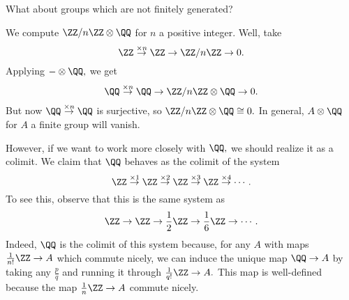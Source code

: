 \documentclass[../notes.tex]{subfiles}
\begin{document}
What about groups which are not finitely generated?
\begin{example}
	We compute $\ZZ/n\ZZ\otimes\QQ$ for $n$ a positive integer. Well, take
	\[\ZZ\stackrel{\times n}\to\ZZ\to\ZZ/n\ZZ\to0.\]
	Applying $-\otimes\QQ,$ we get
	\[\QQ\stackrel{\times n}\to\QQ\to\ZZ/n\ZZ\otimes\QQ\to0.\]
	But now $\QQ\stackrel{\times n}\to\QQ$ is surjective, so $\ZZ/n\ZZ\otimes\QQ\cong0.$ In general, $A\otimes\QQ$ for $A$ a finite group will vanish.
\end{example}
However, if we want to work more closely with $\QQ,$ we should realize it as a colimit. We claim that $\QQ$ behaves as the colimit of the system
\[\ZZ\stackrel{\times1}\to\ZZ\stackrel{\times2}\to\ZZ\stackrel{\times3}\to\ZZ\stackrel{\times4}\to\cdots.\]
To see this, observe that this is the same system as
\[\ZZ\to\ZZ\to\frac12\ZZ\to\frac16\ZZ\to\cdots.\]
Indeed, $\QQ$ is the colimit of this system because, for any $A$ with maps $\frac1{n!}\ZZ\to A$ which commute nicely, we can induce the unique map $\QQ\to A$ by taking any $\frac pq$ and running it through $\frac1{q!}\ZZ\to A.$ This map is well-defined because the map $\frac1n\ZZ\to A$ commute nicely.
\end{document}
